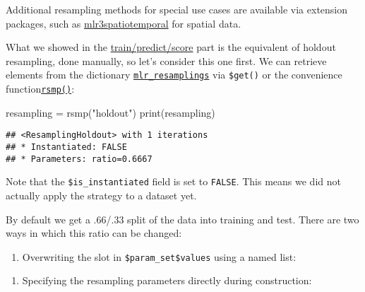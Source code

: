 \documentclass[
]{scrbook}
\newenvironment{Shaded}{\begin{snugshade}}{\end{snugshade}}
\newcommand{\AttributeTok}[1]{\textcolor[rgb]{0.77,0.63,0.00}{#1}}
\newcommand{\FloatTok}[1]{\textcolor[rgb]{0.00,0.00,0.81}{#1}}
\newcommand{\FunctionTok}[1]{\textcolor[rgb]{0.00,0.00,0.00}{#1}}
\newcommand{\NormalTok}[1]{#1}
\newcommand{\OtherTok}[1]{\textcolor[rgb]{0.56,0.35,0.01}{#1}}
\newcommand{\SpecialCharTok}[1]{\textcolor[rgb]{0.00,0.00,0.00}{#1}}
\newcommand{\StringTok}[1]{\textcolor[rgb]{0.31,0.60,0.02}{#1}}
\providecommand{\tightlist}{%
  \setlength{\itemsep}{0pt}\setlength{\parskip}{0pt}}
\renewenvironment{Shaded} {\begin{snugshade}\small} {\end{snugshade}}
\begin{document}
Additional resampling methods for special use cases are available via extension packages, such as \href{https://github.com/mlr-org/mlr3spatiotemporal}{mlr3spatiotemporal} for spatial data.

What we showed in the \protect\hyperlink{train-predict}{train/predict/score} part is the equivalent of holdout resampling, done manually, so let's consider this one first.
We can retrieve elements from the dictionary \href{https://mlr3.mlr-org.com/reference/mlr_resamplings.html}{\texttt{mlr\_resamplings}} via \texttt{\$get()} or the convenience function\href{https://mlr3.mlr-org.com/reference/mlr_sugar.html}{\texttt{rsmp()}}:

\begin{Shaded}
\begin{Highlighting}[]
\NormalTok{resampling }\OtherTok{=} \FunctionTok{rsmp}\NormalTok{(}\StringTok{"holdout"}\NormalTok{)}
\FunctionTok{print}\NormalTok{(resampling)}
\end{Highlighting}
\end{Shaded}

\begin{verbatim}
## <ResamplingHoldout> with 1 iterations
## * Instantiated: FALSE
## * Parameters: ratio=0.6667
\end{verbatim}

Note that the \texttt{\$is\_instantiated} field is set to \texttt{FALSE}.
This means we did not actually apply the strategy to a dataset yet.

By default we get a .66/.33 split of the data into training and test.
There are two ways in which this ratio can be changed:

\begin{enumerate}
\def\labelenumi{\arabic{enumi}.}
\tightlist
\item
  Overwriting the slot in \texttt{\$param\_set\$values} using a named list:
\end{enumerate}

\begin{Shaded}
\end{Shaded}

\begin{enumerate}
\def\labelenumi{\arabic{enumi}.}
\setcounter{enumi}{1}
\tightlist
\item
  Specifying the resampling parameters directly during construction:
\end{enumerate}
\end{document}
